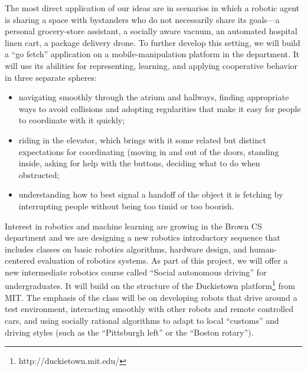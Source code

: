 The most direct application of our ideas are in scenarios in which a
robotic agent is sharing a space with bystanders who do not
necessarily share its goals---a personal grocery-store assistant, a
socially aware vacuum, an automated hospital linen cart, a package delivery
drone. To further develop this setting,
we will
build a ``go fetch'' application on a mobile-manipulation platform in
the department.
It will use its abilities for representing, learning, and applying
cooperative behavior in three separate spheres:
\begin{itemize}
\item navigating smoothly through the atrium and hallways, finding
  appropriate ways to avoid collisions and adopting regularities that
  make it easy for people to coordinate with it quickly;
\item riding in the elevator, which brings with it some related but
  distinct expectations for coordinating (moving in and out of the
  doors, standing inside, asking for help with the buttons, deciding
  what to do when obstructed;
\item understanding how to best signal a handoff of the object it is
  fetching by interrupting people without being too timid or too
  boorish.
\end{itemize}

Interest in robotics and machine learning are growing in the Brown CS
department and we are designing a new robotics introductory sequence
that includes classes on basic robotics algorithms, hardware design,
and human-centered evaluation of robotics systems. As part of this
project, we will offer a new intermediate robotics course called
``Social autonomous driving'' for undergraduates. It will build on the
structure of the Duckietown
platform\footnote{http://duckietown.mit.edu/} from MIT. The emphasis
of the class will be on developing robots that drive around a test
environment, interacting smoothly with other robots and remote
controlled cars, and using socially rational algorithms to adapt to
local ``customs'' and driving styles (such as the ``Pittsburgh left''
or the ``Boston rotary'').

